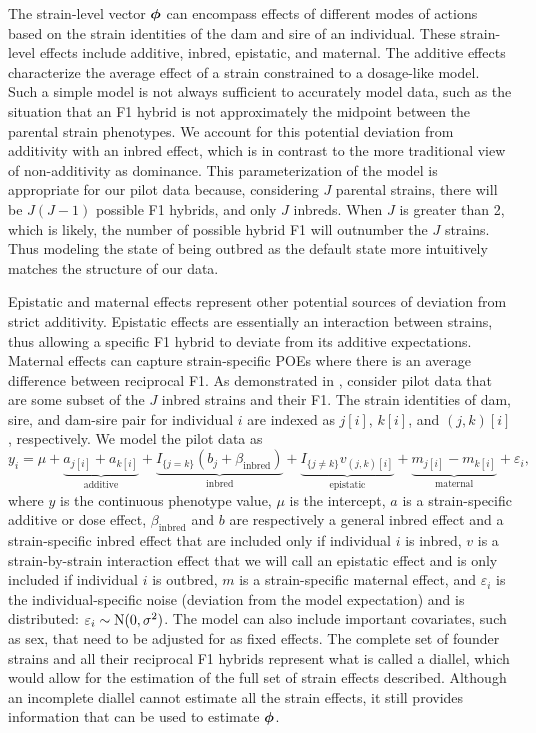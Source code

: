 The strain-level vector $\boldsymbol{\phi}$ can encompass effects of different modes of actions based on the strain identities of the dam and sire of an individual. These strain-level effects include additive, inbred, epistatic, and maternal. The additive effects characterize the average effect of a strain constrained to a dosage-like model. Such a simple model is not always sufficient to accurately model data, such as the situation that an F1 hybrid is not approximately the midpoint between the parental strain phenotypes. We account for this potential deviation from additivity with an inbred effect, which is in contrast to the more traditional view of non-additivity as dominance. This parameterization of the model is appropriate for our pilot data because, considering $J$ parental strains, there will be $J(J-1)$ possible F1 hybrids, and only $J$  inbreds. When $J$ is greater than 2, which is likely, the number of possible hybrid F1 will outnumber the $J$ strains. Thus modeling the state of being outbred as the default state more intuitively matches the structure of our data.

Epistatic and maternal effects represent other potential sources of deviation from strict additivity. Epistatic effects are essentially an interaction between strains, thus allowing a specific F1 hybrid to deviate from its additive expectations. Maternal effects can capture strain-specific POEs where there is an average difference between reciprocal F1. As demonstrated in \cite{Lenarcic2012}, consider pilot data that are some subset of the $J$ inbred strains and their F1. The strain identities of dam, sire, and dam-sire pair for individual $i$ are indexed as $j[i]$, $k[i]$, and $(j,k)[i]$, respectively. We model the pilot data as
\begin{equation} \label{eq:bayesdiallel}
	y_{i} = \mu + \underbrace{a_{j[i]} + a_{k[i]}}_{\text{additive}} + \underbrace{I_{\{j=k\}}(b_{j} + \beta_{\text{inbred}})}_{\text{inbred}} + \underbrace{I_{\{j \neq k\}}v_{(j, k)[i]}}_{\text{epistatic}} + \underbrace{m_{j[i]} - m_{k[i]}}_{\text{maternal}} + \varepsilon_{i},
\end{equation}
where $y$ is the continuous phenotype value, $\mu$ is the intercept, $a$ is a strain-specific additive or dose effect, $\beta_{\text{inbred}}$ and $b$ are respectively a general inbred effect and a strain-specific inbred effect that are included only if individual $i$ is inbred, $v$ is a strain-by-strain interaction effect that we will call an epistatic effect and is only included if individual $i$ is outbred, $m$ is a strain-specific maternal effect, and $\varepsilon_{i}$ is the individual-specific noise (deviation from the model expectation) and is distributed: $\varepsilon_{i} \sim \text{N}(0, \sigma^{2})$. The model can also include important covariates, such as sex, that need to be adjusted for as fixed effects. The complete set of founder strains and all their reciprocal F1 hybrids represent what is called a diallel, which would allow for the estimation of the full set of strain effects described. Although an incomplete diallel cannot estimate all the strain effects, it still provides information that can be used to estimate $\boldsymbol{\phi}$.

